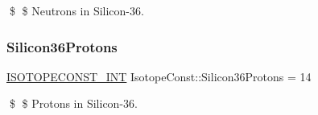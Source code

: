 \$ \$ Neutrons in Silicon-\/36. \mbox{\label{group___isotope_const-_silicon-_si36_ga7a689f3387ebc44b89c63faf4cae4791}} 
\subsubsection{\texorpdfstring{Silicon36\+Protons}{Silicon36Protons}}
{\footnotesize\ttfamily \mbox{\hyperlink{group___isotope_const-_macros_ga5f18360b3e99483a35c32d789e62621c}{I\+S\+O\+T\+O\+P\+E\+C\+O\+N\+S\+T\+\_\+\+I\+NT}} Isotope\+Const\+::\+Silicon36\+Protons = 14}

\$ \$ Protons in Silicon-\/36. 